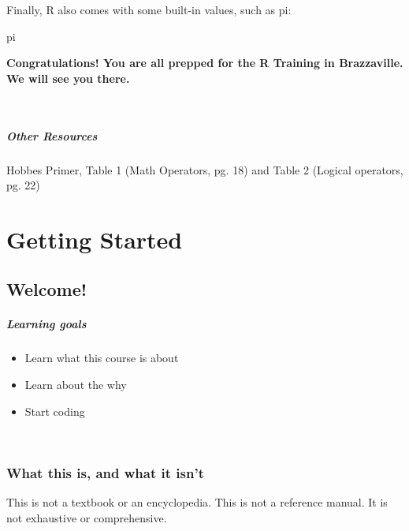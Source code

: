 \documentclass[
]{book}
\newenvironment{Shaded}{\begin{snugshade}}{\end{snugshade}}
\newcommand{\NormalTok}[1]{#1}
\providecommand{\tightlist}{%
  \setlength{\itemsep}{0pt}\setlength{\parskip}{0pt}}
\begin{document}
Finally, R also comes with some built-in values, such as pi:

\begin{Shaded}
\begin{Highlighting}[]
\NormalTok{pi}
\end{Highlighting}
\end{Shaded}

\textbf{Congratulations! You are all prepped for the R Training in Brazzaville. We will see you there.}

~

\subsubsection*{Other Resources}\label{other-resources}

Hobbes Primer, Table 1 (Math Operators, pg. 18) and Table 2 (Logical operators, pg. 22)

\part{Getting Started}\label{part-getting-started}

\chapter{Welcome!}\label{welcome-1}

\subsubsection*{Learning goals}\label{learning-goals-1}

\begin{itemize}
\tightlist
\item
  Learn what this course is about
\item
  Learn about the why
\item
  Start coding
\end{itemize}

~

\section*{What this is, and what it isn't}\label{what-this-is-and-what-it-isnt}

This is not a textbook or an encyclopedia. This is not a reference manual. It is not exhaustive or comprehensive.
\end{document}

